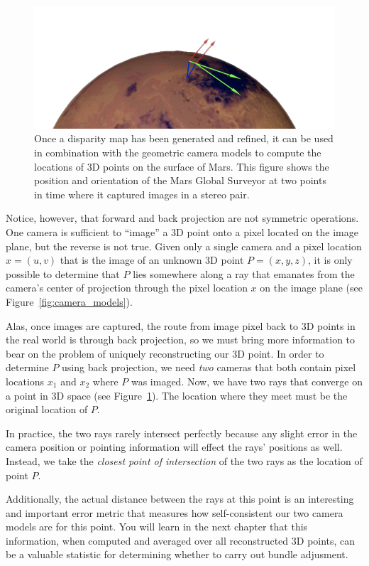 \begin{figure}[tb]
  \centering
  \includegraphics[width=12cm]{images/correlation/triangulation}
  \caption{Once a disparity map has been generated and refined, it can
    be used in combination with the geometric camera models to compute
    the locations of 3D points on the surface of Mars.  This figure
    shows the position and orientation of the Mars Global Surveyor at
    two points in time where it captured images in a stereo pair.}
  \label{fig:triangulation}
\end{figure}

Notice, however, that forward and back projection are not symmetric
operations.  One camera is sufficient to ``image'' a 3D point onto a
pixel located on the image plane, but the reverse is not true.  Given
only a single camera and a pixel location $x = (u,v)$ that is the
image of an unknown 3D point $P = (x,y,z)$, it is only possible to
determine that $P$ lies somewhere along a ray that emanates from the
camera's center of projection through the pixel location $x$ on the
image plane (see Figure~\ref{fig:camera_models}).

Alas, once images are captured, the route from image pixel back to 3D
points in the real world is through back projection, so we must bring
more information to bear on the problem of uniquely reconstructing our
3D point.  In order to determine $P$ using back projection, we need
{\em two} cameras that both contain pixel locations $x_1$ and $x_2$
where $P$ was imaged.  Now, we have two rays that converge on a point
in 3D space (see Figure~\ref{fig:triangulation}). The location where
they meet must be the original location of $P$.

In practice, the two rays rarely intersect perfectly because any
slight error in the camera position or pointing information will
effect the rays' positions as well.  Instead, we take the {\em closest
  point of intersection} of the two rays as the location of point $P$.

Additionally, the actual distance between the rays at this point is an
interesting and important error metric that measures how
self-consistent our two camera models are for this point.  You will
learn in the next chapter that this information, when computed and
averaged over all reconstructed 3D points, can be a valuable statistic for
determining whether to carry out bundle adjusment.





